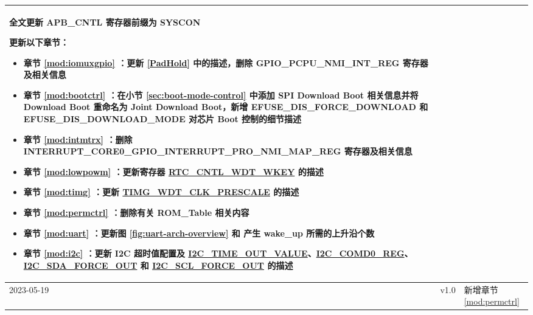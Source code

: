 \begin{longtable}[l]{ | m{2cm} | m{1.5cm} | m{12cm} | }
    全文更新 APB\_CNTL 寄存器前缀为 SYSCON  %

    更新以下章节：
        \begin{itemize}
            \item 章节 \ref{mod:iomuxgpio} \textit{\nameref{mod:iomuxgpio}}：更新 \ref{PadHold} 中的描述，删除 GPIO\_PCPU\_NMI\_INT\_REG 寄存器及相关信息 %
            \item 章节 \ref{mod:bootctrl} \textit{\nameref{mod:bootctrl}}：在小节 \ref{sec:boot-mode-control} 中添加 SPI Download Boot 相关信息并将 Download Boot 重命名为 Joint Download Boot，新增 EFUSE\_DIS\_FORCE\_DOWNLOAD 和 EFUSE\_DIS\_DOWNLOAD\_MODE 对芯片 Boot 控制的细节描述 %
            \item 章节 \ref{mod:intmtrx} \textit{\nameref{mod:intmtrx}}：删除 INTERRUPT\_CORE0\_GPIO\_INTERRUPT\_PRO\_NMI\_MAP\_REG 寄存器及相关信息 %
            \item 章节 \ref{mod:lowpowm} \textit{\nameref{mod:lowpowm}}：更新寄存器 \hyperref[fielddesc:RTCCNTLWDTWKEY]{RTC\_CNTL\_WDT\_WKEY} 的描述 %
            \item 章节 \ref{mod:timg} \textit{\nameref{mod:timg}}：更新 \hyperref[fielddesc:TIMGWDTCLKPRESCALE]{TIMG\_WDT\_CLK\_PRESCALE} 的描述 %
            \item 章节 \ref{mod:permctrl} \textit{\nameref{mod:permctrl}}：删除有关 ROM\_Table 相关内容 %
            \item 章节 \ref{mod:uart} \textit{\nameref{mod:uart}}：更新图 \ref{fig:uart-arch-overview} \textit{\nameref{fig:uart-arch-overview}} 和 产生 wake\_up 所需的上升沿个数 %
            \item 章节 \ref{mod:i2c} \textit{\nameref{mod:i2c}}：更新 I2C 超时值配置及 \hyperref[fielddesc:I2CTIMEOUTVALUE]{I2C\_TIME\_OUT\_VALUE}、\hyperref[regdesc:I2CCOMD0REG]{I2C\_COMD0\_REG}、\hyperref[fielddesc:I2CSDAFORCEOUT]{I2C\_SDA\_FORCE\_OUT} 和 \hyperref[fielddesc:I2CSCLFORCEOUT]{I2C\_SCL\_FORCE\_OUT} 的描述 %
        \end{itemize}
    \\\hline
    2023-05-19 & v1.0 &
        新增章节 \ref{mod:permctrl} \textit{\nameref{mod:permctrl}}


\end{longtable}
